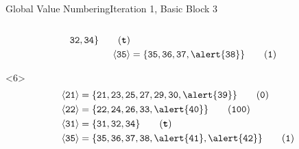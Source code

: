 \documentclass{beamer}
\newcommand{\vn}[1]{\ensuremath{\langle\texttt{#1}\rangle}}
\newcommand{\vreg}[1]{\texttt{#1}}
\begin{document}
\begin{frame}[fragile]{Global Value Numbering}{Iteration 1, Basic Block 3}
\begin{columns}[t,onlytextwidth]
\begin{column}{.5\textwidth}
\begin{onlyenv}
\begin{align*}
                       \vreg{32},
                       \vreg{34}\} \tag{\texttt{\textbf{t}}} \\
          \vn{35} &= \{\vreg{35},
                       \vreg{36},
                       \vreg{37},
                       \alert{\vreg{38}}\} \tag{\texttt{1}}
        \end{align*}
      \end{onlyenv}
      \begin{onlyenv}<6>
        \begin{align*}
          \vn{21} &= \{\vreg{21},
                       \vreg{23},
                       \vreg{25},
                       \vreg{27},
                       \vreg{29},
                       \vreg{30},
                       \alert{\vreg{39}}\} \tag{\texttt{0}} \\
          \vn{22} &= \{\vreg{22},
                       \vreg{24},
                       \vreg{26},
                       \vreg{33},
                       \alert{\vreg{40}}\} \tag{\texttt{100}} \\
          \vn{31} &= \{\vreg{31},
                       \vreg{32},
                       \vreg{34}\} \tag{\texttt{\textbf{t}}} \\
          \vn{35} &= \{\vreg{35},
                       \vreg{36},
                       \vreg{37},
                       \vreg{38},
                       \alert{\vreg{41}},
                       \alert{\vreg{42}}\} \tag{\texttt{1}}
        \end{align*}
      \end{onlyenv}
    \end{column}
  \end{columns}
\end{frame}
\end{document}
